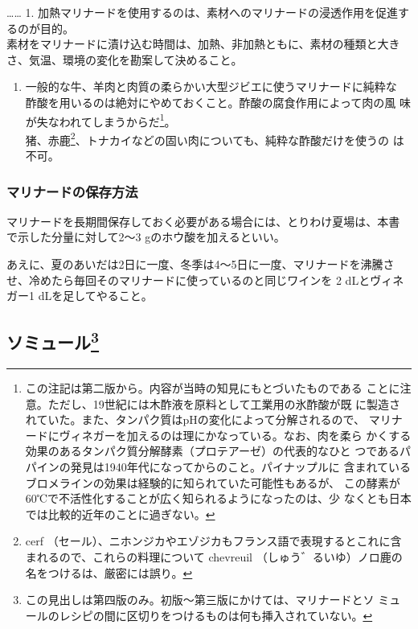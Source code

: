 \begin{recette}
\ldots{}\ldots{} 1.
加熱マリナードを使用するのは、素材へのマリナードの浸透作用を促進するのが目的。\\
素材をマリナードに漬け込む時間は、加熱、非加熱ともに、素材の種類と大き
さ、気温、環境の変化を勘案して決めること。

\begin{enumerate}
\def\labelenumi{\arabic{enumi}.}
\setcounter{enumi}{1}
\tightlist
\item
  一般的な牛、羊肉と肉質の柔らかい大型ジビエに使うマリナードに純粋な
  酢酸を用いるのは絶対にやめておくこと。酢酸の腐食作用によって肉の風
  味が失なわれてしまうからだ\footnote{この注記は第二版から。内容が当時の知見にもとづいたものである
    ことに注意。ただし、19世紀には木酢液を原料として工業用の氷酢酸が既
    に製造されていた。また、タンパク質はpHの変化によって分解されるので、
    マリナードにヴィネガーを加えるのは理にかなっている。なお、肉を柔ら
    かくする効果のあるタンパク質分解酵素（プロテアーゼ）の代表的なひと
    つであるパパインの発見は1940年代になってからのこと。パイナップルに
    含まれているブロメラインの効果は経験的に知られていた可能性もあるが、
    この酵素が60℃で不活性化することが広く知られるようになったのは、少
    なくとも日本では比較的近年のことに過ぎない。}。\\
  猪、赤鹿\footnote{cerf
    （セール）、ニホンジカやエゾジカもフランス語で表現するとこれに含まれるので、これらの料理について
    chevreuil （しゅう゛るいゆ）ノロ鹿の名をつけるは、厳密には誤り。}、トナカイなどの固い肉についても、純粋な酢酸だけを使うの
  は不可。
\end{enumerate}

\hypertarget{conservation-des-marinades}{%
\subsubsection{マリナードの保存方法}\label{conservation-des-marinades}}



マリナードを長期間保存しておく必要がある場合には、とりわけ夏場は、本書
で示した分量に対して2〜3 gのホウ酸を加えるといい。

あえに、夏のあいだは2日に一度、冬季は4〜5日に一度、マリナードを沸騰さ
せ、冷めたら毎回そのマリナードに使っているのと同じワインを 2 dLとヴィネ
ガー1 dLを足してやること。
\end{recette}
\hypertarget{saumures}{%
\subsection[ソミュール]{\texorpdfstring{ソミュール\footnote{この見出しは第四版のみ。初版〜第三版にかけては、マリナードとソ
  ミュールのレシピの間に区切りをつけるものは何も挿入されていない。}}{ソミュール}}\label{saumures}}

